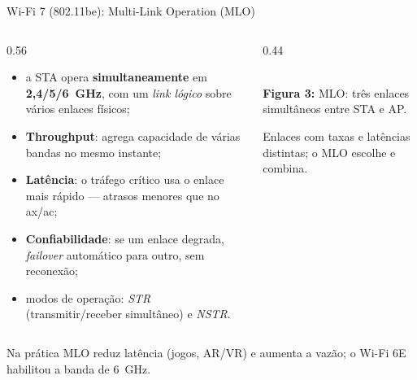 \documentclass[aspectratio=169,11pt]{beamer}
\begin{document}
\begin{frame}{Wi-Fi 7 (802.11be): Multi-Link Operation (MLO)}
  \small
  \begin{columns}
    \begin{column}{0.56\textwidth}
      \begin{itemize}
        \item a STA opera \textbf{simultaneamente} em \textbf{2,4/5/6~GHz}, com um \emph{link lógico} sobre vários enlaces físicos;
        \item \textbf{Throughput}: agrega capacidade de várias bandas no mesmo instante;
        \item \textbf{Latência}: o tráfego crítico usa o enlace mais rápido --- atrasos menores que no ax/ac;
        \item \textbf{Confiabilidade}: se um enlace degrada, \emph{failover} automático para outro, sem reconexão;
        \item modos de operação: \emph{STR} (transmitir/receber simultâneo) e \emph{NSTR}.
      \end{itemize}
    \end{column}
    \begin{column}{0.44\textwidth}
      \begin{center}
        \\[1mm]
        {\scriptsize \textbf{Figura 3:} MLO: três enlaces simultâneos entre STA e AP.}
      \end{center}
      {\scriptsize Enlaces com taxas e latências distintas; o MLO escolhe e combina.}
    \end{column}
  \end{columns}
  \begin{alertblock}{Na prática}
    MLO reduz latência (jogos, AR/VR) e aumenta a vazão; o Wi-Fi 6E habilitou a banda de 6~GHz.
  \end{alertblock}
\end{frame}
\end{document}

